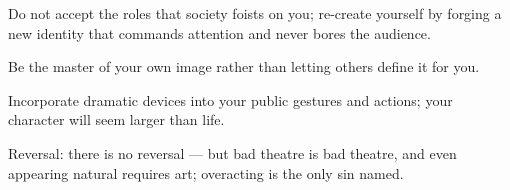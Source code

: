 

\begin{distilled}
  \item Do not accept the roles that society foists on you; re-create yourself by forging a new identity that commands attention and never bores the audience.
  \item Be the master of your own image rather than letting others define it for you.
  \item Incorporate dramatic devices into your public gestures and actions; your character will seem larger than life.
  \item Reversal: there is no reversal --- but bad theatre is bad theatre, and even appearing natural requires art; overacting is the only sin named.
\end{distilled}
